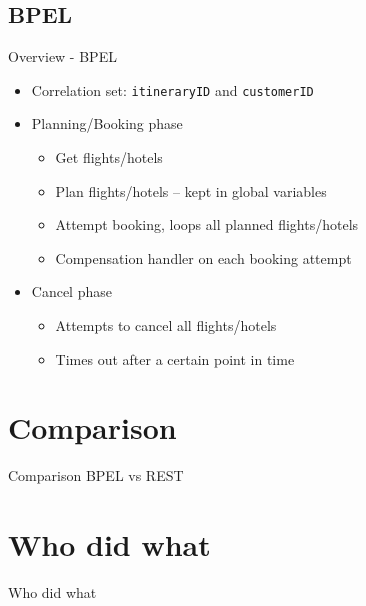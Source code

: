 \subsection{BPEL}
\begin{frame}{Overview - BPEL}
\begin{itemize}[<+->]
\item Correlation set: \texttt{itineraryID} and \texttt{customerID}

\medskip\item Planning/Booking phase
\begin{itemize}
\item Get flights/hotels
\item<3-> Plan flights/hotels -- kept in global variables
\item Attempt booking, loops all planned flights/hotels
\item Compensation handler on each booking attempt
\end{itemize}

\medskip\item Cancel phase
\begin{itemize}
\item Attempts to cancel all flights/hotels
\item<7-> Times out after a certain point in time
\end{itemize}

\end{itemize}
\end{frame}



\section{Comparison}
\begin{frame}{Comparison BPEL vs REST}

\end{frame}


\section{Who did what}
\begin{frame}{Who did what}

\end{frame}


